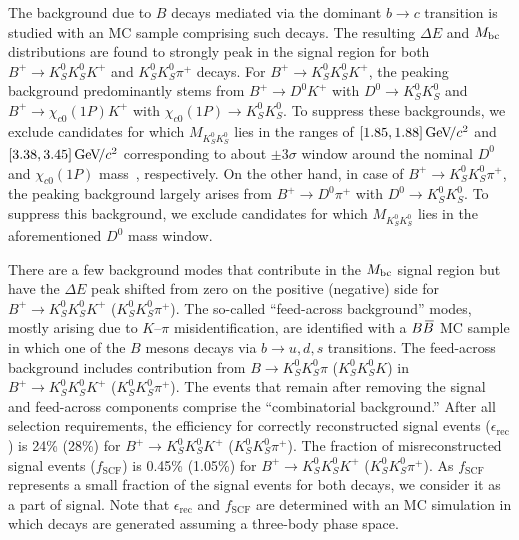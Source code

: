 \documentclass[aps,prl,preprint,tightenlines,superscriptaddress,,amsmath,byrevtex]{revtex4}
\def\pip    {\ensuremath{\pi^+}\xspace}
\def\Kp     {\ensuremath{K^+}\xspace}
\def\KS     {\ensuremath{K^0_{\scriptscriptstyle S}}\xspace}
\def\Dz     {\ensuremath{D^0}\xspace}
\def\Bbar   {\kern 0.18em\overline{\kern -0.18em B}{}\xspace}
\def\BB     {\ensuremath{B\Bbar}\xspace}
\def\Bu     {\ensuremath{B^+}\xspace}
\def\Bp     {\ensuremath{\Bu}\xspace}
\newcommand{\mkk}{\ensuremath{M_{K_{S}^{0}K_{S}^{0}}}\xspace}
\def\mbc    {\mbox{$M_{\rm bc}$}\xspace}
\def\DeltaE {\mbox{$\Delta E$}\xspace}
\def\to{\ensuremath{\rightarrow}\xspace}
\newcommand{\gevcc}{\ensuremath{{\mathrm{\,Ge\kern -0.1em V\!/}c^2}}\xspace}
\begin{document}
The background due to $B$ decays mediated via the dominant $b\to c$ transition 
is studied with an MC sample comprising such decays. The  resulting $\DeltaE$ and $\mbc$ distributions are found to strongly peak in the signal region for both $\Bp\to\KS\KS \Kp$ and  $\KS\KS \pip$ decays. For $\Bp\to\KS\KS\Kp$, the peaking background predominantly stems from $\Bp\to\Dz \Kp$ with $\Dz\to \KS\KS$ and $\Bp\to\chi_{c0}(1P) \Kp$ with $\chi_{c0}(1P)\to \KS\KS$.
To suppress these backgrounds, we exclude candidates for which $\mkk$ lies in the ranges of $[1.85,1.88]\gevcc$ and $[3.38,3.45]\gevcc$ corresponding to about 
$\pm 3\sigma$ window around the nominal $D^0$ and $\chi_{c0}(1P)$ mass~\cite{PDG}, respectively. On the other hand, in case of $\Bp\to\KS\KS\pip$, the peaking background largely arises from $\Bp\to\Dz \pip$ with $\Dz\to \KS\KS$. To suppress this background, we 
exclude candidates for which $\mkk$ lies in the aforementioned $D^{0}$ mass window. 

There are a few background modes that contribute in the $\mbc$ signal
region but have the $\DeltaE$ peak shifted from zero on the positive 
(negative) side for $\Bp\to\KS\KS\Kp$ ($\KS\KS\pip$). The so-called 
``feed-across background'' modes, mostly arising due to $K$--$\pi$ 
misidentification, are identified with a $\BB$ MC sample in which one of 
the $B$ mesons decays via $b\to u,d,s$ transitions. The feed-across background includes contribution from 
$B\to\KS\KS\pi$ ($\KS\KS K$) in $\Bp\to\KS\KS\Kp$ ($\KS\KS\pip$). 
The events that remain after removing the signal and feed-across components 
comprise the ``combinatorial background.'' After all selection requirements, the efficiency for correctly reconstructed signal events ($\epsilon_{\mathrm{rec}}$) is 24\% (28\%) for $\Bp\to\KS\KS\Kp$ ($\KS\KS\pip$). The fraction of misreconstructed signal events ($f_{\mathrm{SCF}}$) is 0.45\% (1.05\%) for $\Bp\to\KS\KS\Kp$ ($\KS\KS\pip$). As $f_{\mathrm{SCF}}$ represents a small fraction of the signal events for both decays, we consider it as a part of signal. Note that $\epsilon_{\mathrm{rec}}$ and $f_{\mathrm{SCF}}$ are determined with an MC simulation in which decays are generated assuming a three-body phase space.
\end{document}
